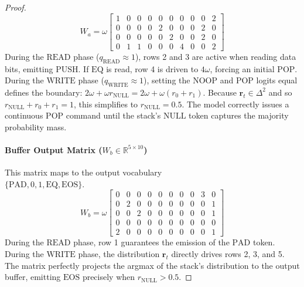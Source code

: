 \documentclass[11pt]{article}
\newcommand{\bm}{\mathbf}
\begin{document}
\begin{proof}
\begin{equation}
W_a = \omega \begin{bmatrix}
1 & 0 & 0 & 0 & 0 & 0 & 0 & 0 & 0 & 2 \\
0 & 0 & 0 & 0 & 2 & 0 & 0 & 0 & 2 & 0 \\
0 & 0 & 0 & 0 & 0 & 2 & 0 & 0 & 2 & 0 \\
0 & 1 & 1 & 0 & 0 & 0 & 4 & 0 & 0 & 2
\end{bmatrix}
\end{equation}
During the $\text{READ}$ phase ($q_{\text{READ}} \approx 1$), rows 2 and 3 are active when reading data bits, emitting $\text{PUSH}$. If $\text{EQ}$ is read, row 4 is driven to $4\omega$, forcing an initial $\text{POP}$. During the $\text{WRITE}$ phase ($q_{\text{WRITE}} \approx 1$), setting the $\text{NOOP}$ and $\text{POP}$ logits equal defines the boundary: $2\omega + \omega r_{\text{NULL}} = 2\omega + \omega(r_0 + r_1)$. Because $\bm{r}_t \in \Delta^2$ and so $r_{\text{NULL}} + r_0 + r_1 = 1$, this simplifies to $r_{\text{NULL}} = 0.5$. The model correctly issues a continuous $\text{POP}$ command until the stack's $\text{NULL}$ token captures the majority probability mass.

\paragraph{Buffer Output Matrix ($W_b \in \mathbb{R}^{5 \times 10}$)}
This matrix maps to the output vocabulary \\$\{\text{PAD}, 0, 1, \text{EQ}, \text{EOS}\}$.
\begin{equation}
W_b = \omega \begin{bmatrix}
0 & 0 & 0 & 0 & 0 & 0 & 0 & 0 & 3 & 0 \\
0 & 2 & 0 & 0 & 0 & 0 & 0 & 0 & 0 & 1 \\
0 & 0 & 2 & 0 & 0 & 0 & 0 & 0 & 0 & 1 \\
0 & 0 & 0 & 0 & 0 & 0 & 0 & 0 & 0 & 0 \\
2 & 0 & 0 & 0 & 0 & 0 & 0 & 0 & 0 & 1
\end{bmatrix}
\end{equation}
During the $\text{READ}$ phase, row 1 guarantees the emission of the $\text{PAD}$ token. During the $\text{WRITE}$ phase, the distribution $\bm{r}_t$ directly drives rows 2, 3, and 5. The matrix perfectly projects the argmax of the stack's distribution to the output buffer, emitting $\text{EOS}$ precisely when $r_{\text{NULL}} > 0.5$. 
\end{proof}
\end{document}
